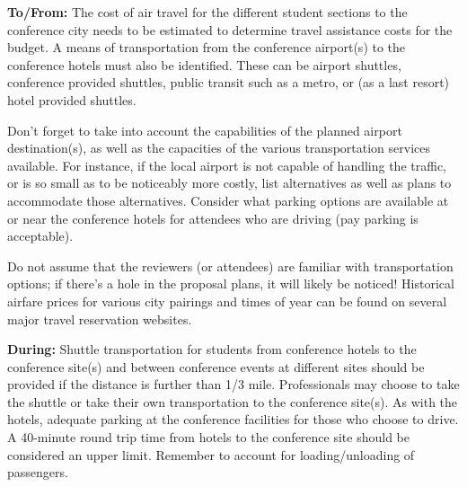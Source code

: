 \documentclass[12pt]{article}
\begin{document}
\textbf{To/From:} The cost of air travel for the different student sections to the conference city needs to be estimated to determine travel assistance costs for the budget. A means of transportation from the conference airport(s) to the conference hotels must also be identified. These can be airport shuttles, conference provided shuttles, public transit such as a metro, or (as a last resort) hotel provided shuttles.

Don't forget to take into account the capabilities of the planned airport destination(s), as well as the capacities of the various transportation services available. For instance, if the local airport is not capable of handling the traffic, or is so small as to be noticeably more costly, list alternatives as well as plans to accommodate those alternatives. Consider what parking options are available at or near the conference hotels for attendees who are driving (pay parking is acceptable).

Do not assume that the reviewers (or attendees) are familiar with transportation options; if there's a hole in the proposal plans, it will likely be noticed! Historical airfare prices for various city pairings and times of year can be found on several major travel reservation websites.

\textbf{During:} Shuttle transportation for students from conference hotels to the conference site(s) and between conference events at different sites should be provided if the distance is further than 1/3 mile. Professionals may choose to take the shuttle or take their own transportation to the conference site(s). As with the hotels, adequate parking at the conference facilities for those who choose to drive. A 40-minute round trip time from hotels to the conference site should be considered an upper limit. Remember to account for loading/unloading of passengers.
\end{document}
